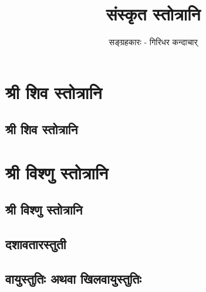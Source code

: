 \documentclass[twoside,a5paper]{report}
\title{\Huge \sanskritN संस्कृत स्तोत्रानि}
\author{\small \sanskrit सङ्ग्रहकारः - गिरिधर कन्दाचार्}
\newcommand*\NewPage{\newpage\null\thispagestyle{empty}\newpage}
\begin{document}
\renewcommand{\chaptername}{\Huge \color{blue}\sanskritN अध्याय}
\renewcommand{\partname}{\color{darkgreen}\sanskritN विभाग}
\maketitle
\NewPage
{}
\tableofcontents
{}
\part{\sanskrit श्री शिव स्तोत्रानि}
\chapter{\color{orange}\sanskrit श्री शिव स्तोत्रानि }


\part{\sanskrit श्री विश्णु स्तोत्रानि}
\chapter{\color{orange}\sanskrit श्री विश्णु स्तोत्रानि }


\chapter{\color{orange}\sanskrit दशावतारस्तुती }


\chapter{\color{orange}\sanskrit वायुस्तुतिः अथवा खिलवायुस्तुतिः  }

\end{document}
